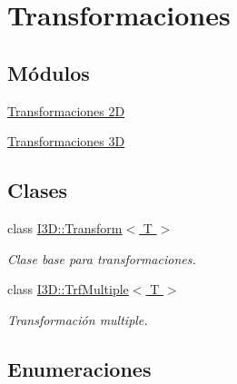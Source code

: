 \hypertarget{group__trf_group}{}\section{Transformaciones}
\label{group__trf_group}
\subsection*{Módulos}
\begin{DoxyCompactItemize}
\item 
\hyperlink{group__trf2_d_group}{Transformaciones 2D}
\item 
\hyperlink{group__trf3_d_group}{Transformaciones 3D}
\end{DoxyCompactItemize}
\subsection*{Clases}
\begin{DoxyCompactItemize}
\item 
class \hyperlink{class_i3_d_1_1_transform}{I3\+D\+::\+Transform$<$ T $>$}
\begin{DoxyCompactList}\small\item\em Clase base para transformaciones. \end{DoxyCompactList}\item 
class \hyperlink{class_i3_d_1_1_trf_multiple}{I3\+D\+::\+Trf\+Multiple$<$ T $>$}
\begin{DoxyCompactList}\small\item\em Transformación multiple. \end{DoxyCompactList}\end{DoxyCompactItemize}
\subsection*{Enumeraciones}
